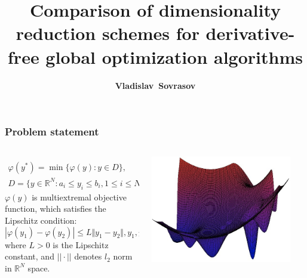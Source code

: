 \documentclass[aspectratio=1610]{beamer}
\title{Comparison of dimensionality reduction schemes for derivative-free global optimization algorithms}
\author{\textbf{Vladislav~Sovrasov}}
\institute{Lobachevsky State University of Nizhni Novgorod}
\date{}
\begin{document}
\begin{frame}
\titlepage
\end{frame}

\begin{frame}
  \frametitle{Problem statement}
  \begin{columns}
    \begin{column}{0.5\textwidth}
      \begin{displaymath}
        \begin{array}{cr}\\
          \varphi(y^*)=\min\{\varphi(y):y\in D\}, \\
          D=\{y\in \mathbb{R}^N:a_i\leq y_i\leq{b_i}, 1\leq{i}\leq{N}\}
        \end{array}
      \end{displaymath}
      \(\varphi(y)\) is multiextremal objective function, which satisfies the Lipschitz condition:
      \begin{displaymath}
        |\varphi(y_1)-\varphi(y_2)|\leq L\Vert y_1-y_2\Vert,y_1,y_2\in D,
      \end{displaymath}
      where \(L>0\) is the Lipschitz constant, and \(||\cdot||\) denotes \(l_2\) norm in \(\mathbb{R}^N\)
      space.
    \end{column}
    \begin{column}{0.5\textwidth}
      \centerline{\includegraphics[width=0.9\textwidth]{img/gkls.png}}
    \end{column}
  \end{columns}
\end{frame}
\end{document}
